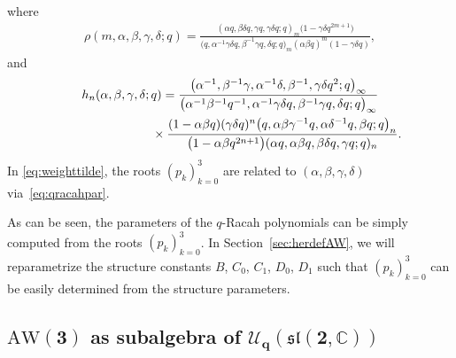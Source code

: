 \documentclass[pdftex]{sigma}
\numberwithin{equation}{section}
\newcommand{\aw}{\mathrm{AW}\!\left(3\right)}
\begin{document}
where
\begin{gather}
	\rho(m,\alpha,\beta,\gamma,\delta;q)= \frac{(\alpha q,\beta\delta q, \gamma q, \gamma\delta q;q)_m\big(1-\gamma\delta q^{2m+1}\big)}{\big(q,\alpha^{-1}\gamma\delta q, \beta^{-1}\gamma q, \delta q;q\big)_m(\alpha\beta q)^m(1-\gamma\delta q)},\label{eq:qracahweight}
\end{gather}
and
\begin{gather}
h_n(\alpha,\beta,\gamma,\delta;q)=\frac{\big(\alpha^{-1},\beta^{-1}\gamma,\alpha^{-1}\delta,\beta^{-1},\gamma\delta q^2;q\big)_\infty}{\big(\alpha^{-1}\beta^{-1} q^{-1},\alpha^{-1}\gamma\delta q, \beta^{-1}\gamma q,\delta q;q\big)_\infty}\nonumber\\
\hphantom{h_n(\alpha,\beta,\gamma,\delta;q)=}{}
\times\frac{(1-\alpha\beta q)(\gamma\delta q)^n \big(q,\alpha\beta\gamma^{-1}q,\alpha\delta^{-1}q,\beta q;q\big)_n}{\big(1-\alpha\beta q^{2n+1}\big)(\alpha q,\alpha\beta q,\beta\delta q,\gamma q;q)_n}. \label{eq:qracahnorm}
\end{gather}
In \eqref{eq:weighttilde}, the roots $(p_k)_{k=0}^3$ are related to $(\alpha,\beta,\gamma,\delta)$ via~\eqref{eq:qracahpar}.

As can be seen, the parameters of the $q$-Racah polynomials can be simply computed from the roots $(p_k)_{k=0}^3$. In Section~\ref{sec:herdefAW}, we will reparametrize the structure constants $B$, $C_0$, $C_1$, $D_0$, $D_1$ such that $(p_k)_{k=0}^3$ can be easily determined from the structure parameters.

\subsection[AW(3) as subalgebra of U\_q(sl(2,C))]{$\boldsymbol{\aw}$ as subalgebra of $\boldsymbol{{\mathcal{U}_{q}(\mathfrak{sl}(2,\mathbb C))}}$}\label{sec:uq}
\end{document}
